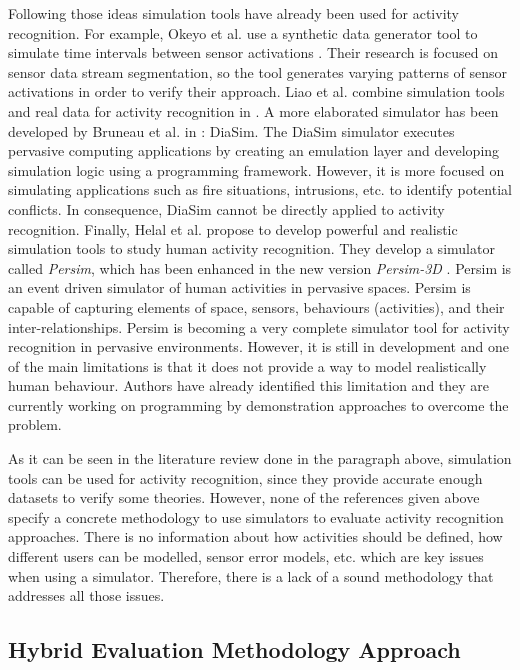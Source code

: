 Following those ideas simulation tools have already been used for activity recognition. For example,   Okeyo et al. use a synthetic data generator tool to simulate time intervals between sensor activations \cite{Okeyo2012a}. Their research is focused on sensor data stream segmentation, so the tool generates varying patterns of sensor activations in order to verify their approach. Liao et al. combine simulation tools and real data for activity recognition in \cite{Liao2006}. A more elaborated simulator has been developed by Bruneau et al. in \cite{Bruneau2009}: DiaSim. The DiaSim simulator executes pervasive computing applications by creating an emulation layer and developing simulation logic using a programming framework. However, it is more focused on simulating applications such as fire situations, intrusions, etc. to identify potential conflicts. In consequence, DiaSim cannot be directly applied to activity recognition. Finally, Helal et al. propose to develop powerful and realistic simulation tools to study human activity recognition. They develop a simulator called \textit{Persim}, which has been enhanced in the new version \textit{Persim-3D} \cite{Helal2012}. Persim is an event driven simulator of human activities in pervasive spaces. Persim is capable of capturing elements of space, sensors, behaviours (activities), and their inter-relationships. Persim is becoming a very complete simulator tool for activity recognition in pervasive environments. However, it is still in development and one of the main limitations is that it does not provide a way to model realistically human behaviour. Authors have already identified this limitation and they are currently working on programming by demonstration approaches to overcome the problem.

As it can be seen in the literature review done in the paragraph above, simulation tools can be used for activity recognition, since they provide accurate enough datasets to verify some theories. However, none of the references given above specify a concrete methodology to use simulators to evaluate activity recognition approaches. There is no information about how activities should be defined, how different users can be modelled, sensor error models, etc. which are key issues when using a simulator. Therefore, there is a lack of a sound methodology that addresses all those issues. 

\subsection{Hybrid Evaluation Methodology Approach}


